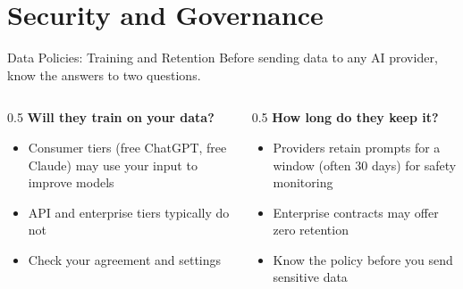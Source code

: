 \documentclass[aspectratio=169]{beamer}
\begin{document}
\section{Security and Governance}

\begin{frame}{Data Policies: Training and Retention}
Before sending data to any AI provider, know the answers to two questions.
\vspace{0.3cm}
\begin{columns}[T]
\begin{column}{0.5\textwidth}
\textbf{Will they train on your data?}
\begin{itemize}\small
  \item \alert{Consumer tiers} (free ChatGPT, free Claude) may use your input to improve models
  \item \alert{API and enterprise tiers} typically do not
  \item Check your agreement and settings
\end{itemize}
\end{column}
\begin{column}{0.5\textwidth}
\textbf{How long do they keep it?}
\begin{itemize}\small
  \item Providers retain prompts for a window (often 30 days) for safety monitoring
  \item Enterprise contracts may offer zero retention
  \item Know the policy \alert{before} you send sensitive data
\end{itemize}
\end{column}
\end{columns}
\end{frame}
\end{document}
